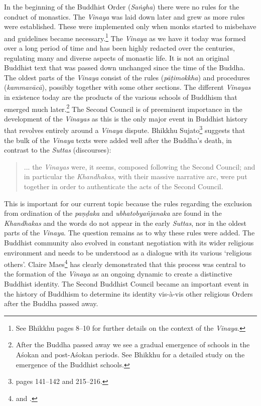 In the beginning of the Buddhist Order (\textit{Saṅgha}) there were no rules for the conduct of monastics. The \textit{Vinaya} was laid down later and grew as more rules were established. These were implemented only when monks started to misbehave and guidelines became necessary.\footnote{See Bhikkhu \cite{sujato2009} pages 8–10 for further details on the context of the \textit{Vinaya}.} The \textit{Vinaya} as we have it today was formed over a long period of time and has been highly redacted over the centuries, regulating many and diverse aspects of monastic life. It is not an original Buddhist text that was passed down unchanged since the time of the Buddha. The oldest parts of the \textit{Vinaya} consist of the rules (\textit{pāṭimokkha}) and procedures (\textit{kammavācā}), possibly together with some other sections. The different \textit{Vinayas} in existence today are the products of the various schools of Buddhism that emerged much later.\footnote{After the Buddha passed away we see a gradual emergence of schools in the Aśokan and post-Aśokan periods. See Bhikkhu \cite{sujato2012} for a detailed study on the emergence of the Buddhist schools.} The Second Council is of preeminent importance in the development of the \textit{Vinayas} as this is the only major event in Buddhist history that revolves entirely around a \textit{Vinaya} dispute. Bhikkhu Sujato\footnote{\cite{sujato2009} pages 141–142 and 215–216.} suggests that the bulk of the \textit{Vinaya} texts were added well after the Buddha's death, in contrast to the \textit{Suttas} (discourses): 

\begin{quote}
... the \textit{Vinayas} were, it seems, composed following the Second Council; and in particular the \textit{Khandhakas}, with their massive narrative arc, were put together in order to authenticate the acts of the Second Council.
\end{quote}

This is important for our current topic because the rules regarding the exclusion from ordination of the \textit{paṇḍaka} and \textit{ubhatob­yañ­janaka} are found in the \textit{Khandhakas} and the words do not appear in the early \textit{Suttas}, nor in the oldest parts of the \textit{Vinaya}. The question remains as to why these rules were added. The Buddhist community also evolved in constant negotiation with its wider religious environment and needs to be understood as a dialogue with its various `religious others'. Claire Maes\footnote{\cite{maes} and \cite{maes2016}.} has clearly demonstrated that this process was central to the formation of the \textit{Vinaya} as an ongoing dynamic to create a distinctive Buddhist identity. The Second Buddhist Council became an important event in the history of Buddhism to determine its identity vis-à-vis other religious Orders after the Buddha passed away.

